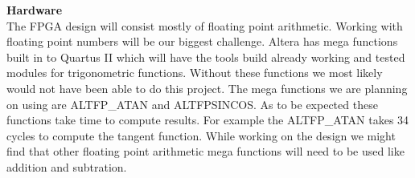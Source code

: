 \textbf{Hardware}\\

The FPGA design will consist mostly of floating point arithmetic. Working 
with floating point numbers will be our biggest challenge. Altera has 
mega functions built in to Quartus II which will have the tools build 
already working and tested modules for trigonometric functions. Without 
these functions we most likely would not have been able to do this project. 
The mega functions we are planning on using 
are ALTFP\_ATAN and ALTFPSINCOS. As to be expected these functions take 
time to compute results. For example the ALTFP\_ATAN takes 34 cycles to 
compute the tangent function. While working on the design we might find 
that other floating point arithmetic mega functions will need to be used 
like addition and subtration. 

